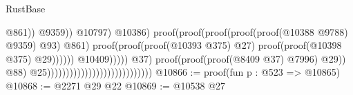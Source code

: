 \begin{lexlean}{RustBase}
\begin{coremodule}
                                                                                                                    @861))
                                                                                                              @9359))
                                                                                                        @10797)
                                                                                                      @10386)
                                                                                                    proof(proof(proof(proof(proof(@10388
                                                                                                                @9788)
                                                                                                              @9359)
                                                                                                            @93)
                                                                                                          @861)
                                                                                                        proof(proof(proof(@10393
                                                                                                                @375)
                                                                                                              @27)
                                                                                                            proof(proof(@10398
                                                                                                                  @375)
                                                                                                                @29))))))
                                                                                          @10409)))))
                                                                              @37)
                                                                            proof(proof(proof(@8409
                                                                                    @37)
                                                                                  @7996)
                                                                                @29))
                                                                          @88)
                                                                        @25))))))))))))))))))))))))))))
@10866 := proof(fun {p : @523} => @10865)
@10868 := @2271 @29 @22
@10869 := @10538 @27

\end{coremodule}
\end{lexlean}
